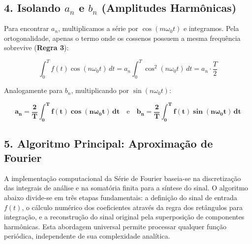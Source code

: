 \subsection*{4. Isolando $a_n$ e $b_n$ (Amplitudes Harmônicas)}

Para encontrar $a_n$, multiplicamos a série por $\cos(m\omega_0 t)$ e integramos. Pela ortogonalidade, apenas o termo onde os cossenos possuem a mesma frequência sobrevive (\textbf{Regra 3}):

\begin{equation}
\int_0^T f(t) \cos(n\omega_0 t) \, dt = a_n \int_0^T \cos^2(n\omega_0 t) \, dt = a_n \cdot \frac{T}{2}
\end{equation}

Analogamente para $b_n$, multiplicando por $\sin(n\omega_0 t)$:

\begin{equation}
\mathbf{a_n = \frac{2}{T} \int_0^T f(t) \cos(n\omega_0 t) \, dt} \quad \text{e} \quad \mathbf{b_n = \frac{2}{T} \int_0^T f(t) \sin(n\omega_0 t) \, dt}
\end{equation}


\subsection*{5. Algoritmo Principal: Aproximação de Fourier}

A implementação computacional da Série de Fourier baseia-se na discretização das integrais de análise e na somatória finita para a síntese do sinal. O algoritmo abaixo divide-se em três etapas fundamentais: a definição do sinal de entrada $f(t)$, o cálculo numérico dos coeficientes através da regra dos retângulos para integração, e a reconstrução do sinal original pela superposição de componentes harmônicas. Esta abordagem universal permite processar qualquer função periódica, independente de sua complexidade analítica.

